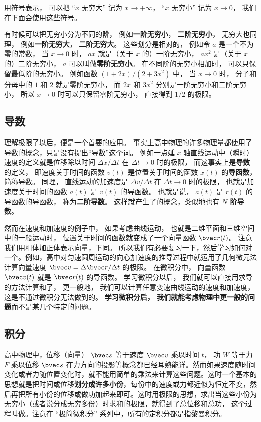 用符号表示， 可以把 “$x$ 无穷大” 记为 $x \to +\infty$， “$x$ 无穷小” 记为 $x \to 0$， 我们在下面会使用这些符号。

有时候可以把无穷小分为不同的\textbf{阶}， 例如\textbf{一阶无穷小}， \textbf{二阶无穷小}， 无穷大也同理， 例如\textbf{一阶无穷大}， \textbf{二阶无穷大}。 这些划分是相对的， 例如令 $a$ 是一个不为零的常数， 当 $x \to 0$ 时， $a x$ 就是（关于 $x$ 的）一阶无穷小， $a x^2$ 是（关于 $x$ 的）二阶无穷小， $a$ 可以叫做\textbf{零阶无穷小}。 在不同阶的无穷小相加时， 可以只保留最低阶的无穷小。 例如函数 $(1+2x)/(2+3x^2)$ 中， 当 $x\to 0$ 时， 分子和分母中的 $1$ 和 $2$ 就是零阶无穷小， 而 $2x$ 和 $3x^2$ 分别是一阶无穷小和二阶无穷小， 所以 $x\to 0$ 时可以只保留零阶无穷小， 直接得到 $1/2$ 的极限。

\subsection{导数}
理解极限了以后，便是一个首要的应用。 事实上高中物理的许多物理量都使用了导数的概念，只是没有提出“导数”这个词。 例如一点延 $x$ 轴直线运动中（瞬时）速度的定义就是位移除以时间 $\Delta x/\Delta t$ 在 $\Delta t \to 0$ 时的极限， 而这事实上是\textbf{导数}的定义， 即速度关于时间的函数 $v(t)$ 是位置关于时间的函数 $x(t)$ 的\textbf{导函数}， 简称导数。 同理， 直线运动的加速度是 $\Delta v/\Delta t$ 在 $\Delta t \to 0$ 时的极限， 也就是加速度关于时间的函数 $a(t)$ 是 $v(t)$ 的导函数。 也就是说， $a(t)$ 是 $r(t)$ 的导函数的导函数， 称为\textbf{二阶导数}。 这样就产生了的概念，类似地也有 \textbf{$N$ 阶导数}。

然而在速度和加速度的例子中， 如果考虑曲线运动， 也就是二维平面和三维空间中的一般运动时， 位置关于时间的函数就变成了一个向量函数 $\bvec r(t)$。 注意我们用粗体加正体表示向量，下同。 所以我们有必要复习一下，然后学习如何对一个。例如，高中对匀速圆周运动的向心加速度的推导过程中就运用了几何微元法计算向量速度 $\bvec v = \Delta \bvec r/\Delta t$ 的极限。 在微积分中， 向量函数 $\bvec v(t)$ 就是 $\bvec r(t)$ 的导函数。 学习微积分以后， 我们就可以直接用求导的方法计算和了， 更一般地， 我们可以计算任意变速曲线运动的速度和加速度， 这是不通过微积分无法做到的。 \textbf{学习微积分后， 我们就能考虑物理中更一般的问题}而不是某几个特定的问题。


\subsection{积分}
高中物理中，位移（向量） $\bvec s$ 等于速度 $\bvec v$ 乘以时间 $t$， 功 $W$ 等于力 $F$ 乘以位移 $\bvec s$ 在力方向的投影等概念都已经耳熟能详。然而如果速度随时间变化或者力随位置变化时，就不能用简单的乘法来计算这些问题。这时一个基本的思想就是把时间或位移\textbf{划分成许多小份}，每份中的速度或力都近似为恒定不变，然后再把所有小份的位移或做功加起来即可。这时用极限的思想，求出当这些小份为无穷小（或者说分成无穷多份）时求和的极限，就得到了总位移和总功， 这个过程叫做。注意在 “极简微积分” 系列中，所有的定积分都是指黎曼积分。 %

